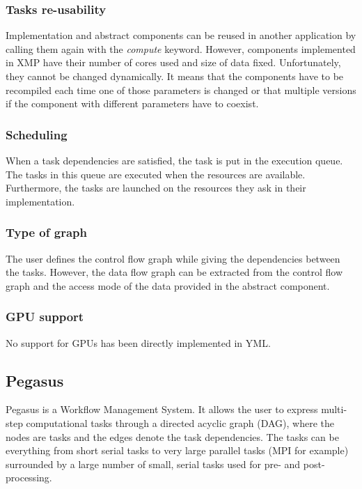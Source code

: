 \subsubsection{Tasks re-usability}
Implementation and abstract components can be reused in another application by calling them again with the \textit{compute} keyword.
However, components implemented in XMP have their number of cores used and size of data fixed.
Unfortunately, they cannot be changed dynamically.
It means that the components have to be recompiled each time one of those parameters is changed or that multiple versions if the component with different parameters have to coexist.

\subsubsection{Scheduling}
When a task dependencies are satisfied, the task is put in the execution queue.
The tasks in this queue are executed when the resources are available.
Furthermore, the tasks are launched on the resources they ask in their implementation.

\subsubsection{Type of graph}
The user defines the control flow graph while giving the dependencies between the tasks.
However, the data flow graph can be extracted from the control flow graph and the access mode of the data provided in the abstract component.

\subsubsection{GPU support}
No support for GPUs has been directly implemented in YML.




\subsection{Pegasus}
Pegasus \cite{DSSBG2005} \cite{DVJRC2015} is a Workflow Management System.
It allows the user to express multi-step computational tasks through a directed acyclic graph (DAG), where the nodes are tasks and the edges denote the task dependencies.
The tasks can be everything  from short serial tasks to very large parallel tasks (MPI for example) surrounded by a large number of small, serial tasks used for pre- and post-processing.

